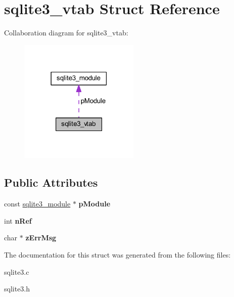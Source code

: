\hypertarget{structsqlite3__vtab}{\section{sqlite3\-\_\-vtab Struct Reference}
\label{structsqlite3__vtab}
}


Collaboration diagram for sqlite3\-\_\-vtab\-:\nopagebreak
\begin{figure}[H]
\begin{center}
\leavevmode
\includegraphics[width=162pt]{structsqlite3__vtab__coll__graph}
\end{center}
\end{figure}
\subsection*{Public Attributes}
\begin{DoxyCompactItemize}
\item 
\hypertarget{structsqlite3__vtab_acf0d906e36b113669eaa883c5f8b5ba0}{const \hyperlink{structsqlite3__module}{sqlite3\-\_\-module} $\ast$ {\bfseries p\-Module}}\label{structsqlite3__vtab_acf0d906e36b113669eaa883c5f8b5ba0}

\item 
\hypertarget{structsqlite3__vtab_ab3c80d385849bdd82363a0df7d6fcba8}{int {\bfseries n\-Ref}}\label{structsqlite3__vtab_ab3c80d385849bdd82363a0df7d6fcba8}

\item 
\hypertarget{structsqlite3__vtab_a47331586775d674ae951b07ebb902fca}{char $\ast$ {\bfseries z\-Err\-Msg}}\label{structsqlite3__vtab_a47331586775d674ae951b07ebb902fca}

\end{DoxyCompactItemize}


The documentation for this struct was generated from the following files\-:\begin{DoxyCompactItemize}
\item 
sqlite3.\-c\item 
sqlite3.\-h\end{DoxyCompactItemize}
